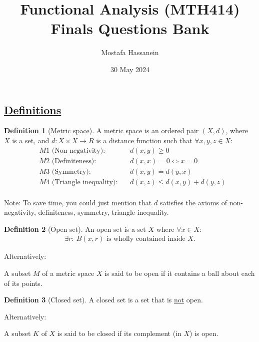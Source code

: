 \documentclass{article}
\author{Mostafa Hassanein}
\title{Functional Analysis (MTH414) Finals Questions Bank}
\date{30 May 2024}
\theoremstyle{definition}
\newtheorem{definition}{Definition}
\begin{document}
\maketitle

\newpage

\begin{center}
  \section*{\underline{Definitions}}
\end{center}

\begin{definition}[Metric space]
  A metric space is an ordered pair $(X,d)$, 
  where $X$ is a set, 
  and $d: X \times X \longrightarrow R$ is a distance function
  such that $\forall x, y, z \in X$:
  \begin{align*}
    &M1 \text{ (Non-negativity)}: &&d(x,y) \geq 0 \\
    &M2 \text{ (Definiteness)}:   &&d(x,x) = 0 \iff x = 0 \\
    &M3 \text{ (Symmetry)}:   &&d(x,y) = d(y,x) \\
    &M4 \text{ (Triangle inequality)}:   &&d(x,z) \leq d(x,y) + d(y,z) \\
  \end{align*}

  Note: To save time, you could just mention that $d$ satisfies the axioms of non-negativity, definiteness, symmetry, triangle inequality.
\end{definition}

\begin{definition}[Open set]
  An open set is a set $X$ where $\forall x \in X$:
  \begin{align*}
    \exists r: \: B(x,r) \text{ is wholly contained inside } X.
  \end{align*}

  \noindent
  Alternatively: 

  A subset $M$ of a metric space $X$ is said to be open if it contains a ball about each of its points.
\end{definition}

\begin{definition}[Closed set]
  A closed set is a set that is \underline{not} open.

  \noindent
  Alternatively:

  A subset $K$ of $X$ is said to be closed if its complement (in $X$) is open.
\end{definition}
\end{document}
